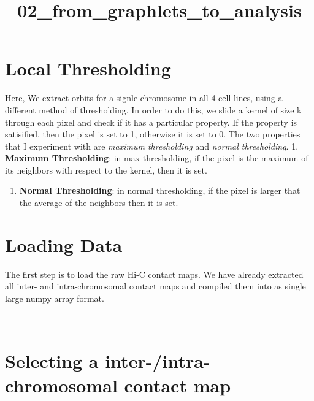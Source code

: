 \documentclass[11pt]{article}
\title{02\_from\_graphlets\_to\_analysis}
\providecommand{\tightlist}{%
      \setlength{\itemsep}{0pt}\setlength{\parskip}{0pt}}
\begin{document}
    
    
    \maketitle
    
     

    
    \section{Local Thresholding}\label{local-thresholding}

Here, We extract orbits for a signle chromosome in all 4 cell
lines, using a different method of thresholding. In order to do this, we
slide a kernel of size k through each pixel and check if it has a
particular property. If the property is satisified, then the pixel is
set to 1, otherwise it is set to 0. The two properties that I experiment
with are \emph{maximum thresholding} and \emph{normal thresholding}. 1.
\textbf{Maximum Thresholding}: in max thresholding, if the pixel is the
maximum of its neighbors with respect to the kernel, then it is set.

\begin{enumerate}
\def\labelenumi{\arabic{enumi}.}
\setcounter{enumi}{1}
\tightlist
\item
  \textbf{Normal Thresholding}: in normal thresholding, if the pixel is
  larger that the average of the neighbors then it is set.
\end{enumerate}

    \section{Loading Data}\label{loading-data}

The first step is to load the raw Hi-C contact maps. We have already
extracted all inter- and intra-chromosomal contact maps and compiled
them into as single large numpy array format.

    \begin{center}
    \end{center}
    { \hspace*{\fill} \\}
    
    \section{Selecting a inter-/intra-chromosomal contact
map}\label{selecting-a-inter-intra-chromosomal-contact-map}
\end{document}
